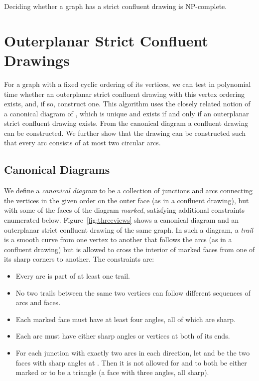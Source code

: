 \documentclass{llncs}
\begin{document}
\begin {theorem}
  Deciding whether a graph has a strict confluent drawing is NP-complete.
\end {theorem}

\section {Outerplanar Strict Confluent Drawings}


For a graph  with a fixed cyclic ordering of its vertices, we can test in polynomial time whether an outerplanar strict confluent drawing with this vertex ordering exists, and, if so, construct one. This algorithm uses the closely related notion of a canonical diagram of , which is unique and exists if and only if an outerplanar strict confluent drawing exists. From the canonical diagram a confluent drawing can be constructed. We further show that the drawing can be constructed such that every arc consists of at most two circular arcs. 



\subsection{Canonical Diagrams}

We define a \emph{canonical diagram} to be a collection of junctions and arcs connecting the vertices in the given order on the outer face (as in a confluent drawing), but with some of the faces of the diagram \emph{marked}, satisfying additional constraints enumerated below. Figure~\ref{fig:threeviews} shows a canonical diagram and an outerplanar strict confluent drawing of the same graph. In such a diagram, a \emph{trail} is a smooth curve from one vertex to another that follows the arcs (as in a confluent drawing) but is allowed to cross the interior of marked faces from one of its sharp corners to another. The constraints are:
\begin{itemize}
\item Every arc is part of at least one trail.
\item No two trails between the same two vertices can follow different sequences of arcs and faces.
\item Each marked face must have at least four angles, all of which are sharp.
\item Each arc must have either sharp angles or vertices at both of its ends.
\item For each junction  with exactly two arcs in each direction, let  and  be the two faces with sharp angles at . Then it is not allowed for  and  to both be either marked or to be a triangle (a face with three angles, all sharp).
\end{itemize}
\end{document}
